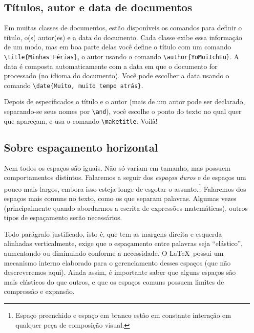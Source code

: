 \subsection{Títulos, autor e data de documentos}

Em muitas classes de documentos, estão disponíveis os comandos para
definir o título, o(s) autor(es) e a data do documento. Cada classe
exibe essa informação de um modo, mas em boa parte delas você define o
título com um comando \verb'\title{Minhas Férias}', o autor usando o
comando \verb'\author{YoMoiIchEu}'. A data é composta automaticamente
com a data em que o documento for processado (no idioma do
documento). Você pode escolher a data usando o comando
\verb'\date{Muito, muito tempo atrás}'.

Depois de especificados o título e o autor (mais de um autor pode ser
declarado, separando-se seus nomes por \verb'\and'), você escolhe o
ponto do texto no qual quer que apareçam, e usa o comando
\verb'\maketitle'. Voilà!

\subsection{Sobre espaçamento horizontal}\label{sec:espacos}

Nem todos os espaços são iguais. Não só variam em tamanho, mas possuem
comportamentos distintos. Falaremos a seguir dos 
\emph{espaços duros}
e de espaços um pouco mais largos, embora isso esteja longe de esgotar
o assunto.\footnote{Espaço preenchido e espaço em branco estão em
  constante interação em qualquer peça de composição visual.} Falaremos dos espaços mais comuns no texto, como os que separam palavras. Algumas vezes (principalmente quando abordarmos a escrita de expressões matemáticas), outros tipos de espaçamento serão necessários. 

Todo parágrafo justificado, isto é, que tem as margens direita e
esquerda alinhadas verticalmente, exige que o espaçamento entre palavras seja ``elástico'',
aumentando ou diminuindo conforme a necessidade. O \LaTeX\ possui um
mecanismo interno elaborado para o gerenciamento desses espaços (que não descreveremos aqui). Ainda
assim, é importante saber que alguns espaços são mais elásticos do que
outros, e que os espaços comuns possuem limites de compressão e
expansão.

